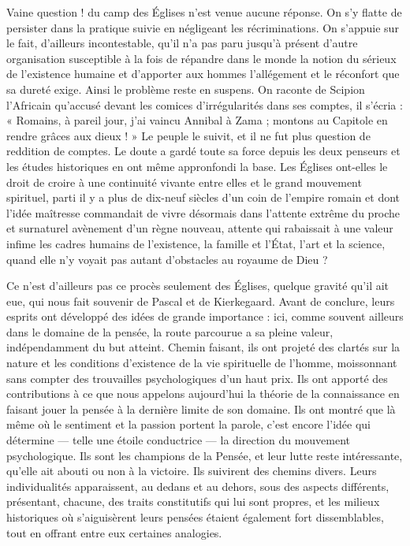 \documentclass[12pt,a4paper]{article}
\newcommand{\opage}[1]{\marginnote{\footnotesize\textit{[#1]}}}
\begin{document}
Vaine question ! du camp des Églises n'est venue aucune réponse.
On s'y flatte de persister dans la pratique suivie en négligeant les récriminations.
On s'appuie sur le fait, d'ailleurs incontestable, qu'il n'a
pas paru jusqu'à présent d'autre organisation susceptible à la fois de
répandre dans le monde la notion du sérieux de l'existence humaine
\opage{222} et d'apporter aux hommes l'allégement et le réconfort que sa dureté
exige. Ainsi le problème reste en suspens. On raconte de Scipion
l'Africain qu'accusé devant les comices d'irrégularités dans ses
comptes, il s'écria : « Romains, à pareil jour, j'ai vaincu Annibal à
Zama ; montons au Capitole en rendre grâces aux dieux ! » Le peuple
le suivit, et il ne fut plus question de reddition de comptes. Le
doute a gardé toute sa force depuis les deux penseurs et les études
historiques en ont même appronfondi la base.
Les Églises ont-elles
le droit de croire à une continuité vivante entre elles et le grand
mouvement spirituel, parti il y a plus de dix-neuf siècles d'un coin
de l'empire romain et dont l'idée maîtresse commandait de vivre
désormais dans l'attente extrême du proche et surnaturel avènement
d'un règne nouveau, attente qui rabaissait à une valeur infime
les cadres humains de l'existence, la famille et l'État, l'art et la
science, quand elle n'y voyait pas autant d'obstacles au royaume de
Dieu ?

Ce n'est d'ailleurs pas ce procès seulement des Églises, quelque
gravité qu'il ait eue, qui nous fait souvenir de Pascal et de Kierkegaard.
Avant de conclure, leurs esprits ont développé des idées de
grande importance : ici, comme souvent ailleurs dans le domaine de
la pensée, la route parcourue a sa pleine valeur, indépendamment
du but atteint. Chemin faisant, ils ont projeté des clartés sur la
nature et les conditions d'existence de la vie spirituelle de l'homme,
moissonnant sans compter des trouvailles psychologiques d'un haut
prix. Ils ont apporté des contributions à ce que nous appelons
aujourd'hui la théorie de la connaissance en faisant jouer la pensée
à la dernière limite de son domaine. Ils ont montré que là même
où le sentiment et la passion portent la parole, c'est encore l'idée
qui détermine --- telle une étoile conductrice --- la direction du
mouvement psychologique. Ils sont les champions de la Pensée, et
leur lutte reste intéressante, qu'elle ait abouti ou non à la victoire.
Ils suivirent des chemins divers. Leurs individualités apparaissent,
au dedans et au dehors, sous des aspects différents, présentant,
chacune, des traits constitutifs qui lui sont propres, et les milieux
historiques où s'aiguisèrent leurs pensées étaient également fort
dissemblables, tout en offrant entre eux certaines analogies.
\end{document}

